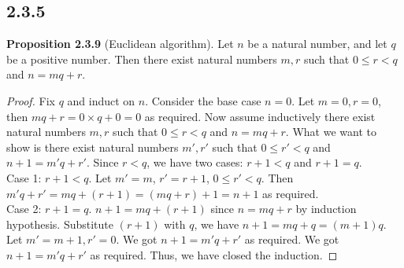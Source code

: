 \documentclass[12pt, letter]{article}
\begin{document}
\subsection*{2.3.5}
\textbf{Proposition 2.3.9} (Euclidean algorithm). Let $n$ be a natural number, and let $q$ be a positive number. Then there exist natural numbers $m,r$ such that 
$0\leq r<q$ and $n=mq+r$.
\begin{proof}
    Fix $q$ and induct on $n$. Consider the base case $n=0$. Let $m=0,r=0$, then $mq+r=0\times q+0=0$ as required. Now assume inductively there exist natural numbers $m,r$ such that 
    $0\leq r<q$ and $n=mq+r$. What we want to show is there exist natural numbers $m',r'$ such that $0\leq r'<q$ and $n+1=m'q+r'$. Since $r<q$, we have two cases: $r+1<q$ and $r+1=q$. \\
    Case 1: $r+1<q$. Let $m'=m$, $r'=r+1$, $0\leq r'<q$. Then $m'q+r'=mq+(r+1)=(mq+r)+1=n+1$ as required. \\
    Case 2: $r+1=q$. $n+1=mq+(r+1)$ since $n=mq+r$ by induction hypothesis. Substitute $(r+1)$ with $q$, we have $n+1=mq+q=(m+1)q$. Let $m'=m+1,r'=0$. We got $n+1=m'q+r'$ as required.  
    We got $n+1=m'q+r'$ as required. Thus, we have closed the induction.
\end{proof}
\end{document}
